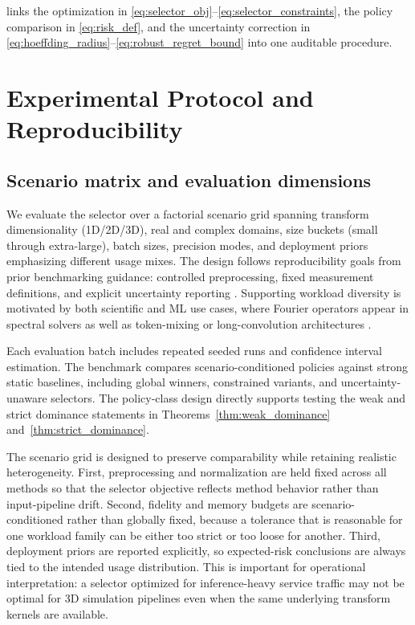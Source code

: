\documentclass{article} %
\begin{document}
 links the optimization in \eqref{eq:selector_obj}--\eqref{eq:selector_constraints}, the policy comparison in \eqref{eq:risk_def}, and the uncertainty correction in \eqref{eq:hoeffding_radius}--\eqref{eq:robust_regret_bound} into one auditable procedure.

\section{Experimental Protocol and Reproducibility}
\label{sec:repro_details}
\subsection{Scenario matrix and evaluation dimensions}
We evaluate the selector over a factorial scenario grid spanning transform dimensionality (1D/2D/3D), real and complex domains, size buckets (small through extra-large), batch sizes, precision modes, and deployment priors emphasizing different usage mixes. The design follows reproducibility goals from prior benchmarking guidance: controlled preprocessing, fixed measurement definitions, and explicit uncertainty reporting \citep{S03,S21,S42}. Supporting workload diversity is motivated by both scientific and ML use cases, where Fourier operators appear in spectral solvers as well as token-mixing or long-convolution architectures \citep{S15,S16,S18,S19,S20}.

Each evaluation batch includes repeated seeded runs and confidence interval estimation. The benchmark compares scenario-conditioned policies against strong static baselines, including global winners, constrained variants, and uncertainty-unaware selectors. The policy-class design directly supports testing the weak and strict dominance statements in Theorems~\ref{thm:weak_dominance} and~\ref{thm:strict_dominance}.

The scenario grid is designed to preserve comparability while retaining realistic heterogeneity. First, preprocessing and normalization are held fixed across all methods so that the selector objective reflects method behavior rather than input-pipeline drift. Second, fidelity and memory budgets are scenario-conditioned rather than globally fixed, because a tolerance that is reasonable for one workload family can be either too strict or too loose for another. Third, deployment priors are reported explicitly, so expected-risk conclusions are always tied to the intended usage distribution. This is important for operational interpretation: a selector optimized for inference-heavy service traffic may not be optimal for 3D simulation pipelines even when the same underlying transform kernels are available.
\end{document}
